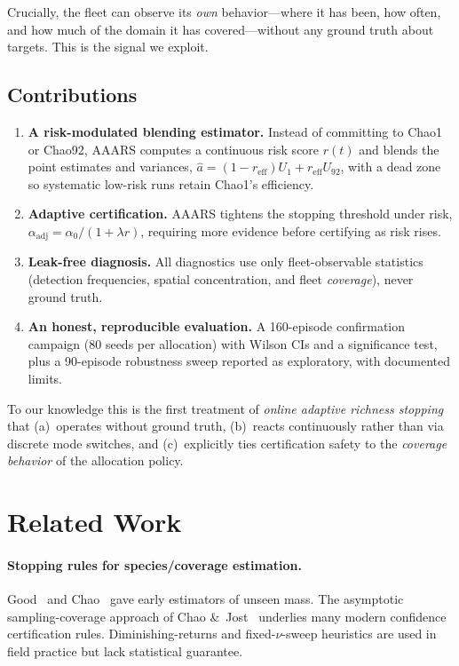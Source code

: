 \documentclass[11pt]{article}
\begin{document}
Crucially, the fleet can observe its \emph{own} behavior---where it has been, how often, and how
much of the domain it has covered---without any ground truth about targets. This is the signal we
exploit.

\subsection{Contributions}
\begin{enumerate}
\item \textbf{A risk-modulated blending estimator.} Instead of committing to Chao1 or Chao92, AAARS
computes a continuous risk score $r(t)$ and blends the point estimates and variances,
$\hat a=(1-r_{\mathrm{eff}})U_1 + r_{\mathrm{eff}}U_{92}$, with a dead zone so systematic low-risk
runs retain Chao1's efficiency.
\item \textbf{Adaptive certification.} AAARS tightens the stopping threshold under risk,
$\alpha_{\mathrm{adj}}=\alpha_0/(1+\lambda r)$, requiring more evidence before certifying as risk
rises.
\item \textbf{Leak-free diagnosis.} All diagnostics use only fleet-observable statistics
(detection frequencies, spatial concentration, and fleet \emph{coverage}), never ground truth.
\item \textbf{An honest, reproducible evaluation.} A 160-episode confirmation campaign (80 seeds per
allocation) with Wilson CIs and a significance test, plus a 90-episode robustness sweep reported as
exploratory, with documented limits.
\end{enumerate}

To our knowledge this is the first treatment of \emph{online adaptive richness stopping} that
(a)~operates without ground truth, (b)~reacts continuously rather than via discrete mode switches,
and (c)~explicitly ties certification safety to the \emph{coverage behavior} of the allocation
policy.

\section{Related Work}
\label{sec:related}

\paragraph{Stopping rules for species/coverage estimation.}
Good~\cite{good1953} and Chao~\cite{chao1987} gave early estimators of unseen mass. The asymptotic
sampling-coverage approach of Chao \&~Jost~\cite{chao2012} underlies many modern confidence
certification rules. Diminishing-returns and fixed-$\nu$-sweep heuristics are used in field
practice but lack statistical guarantee.
\end{document}
